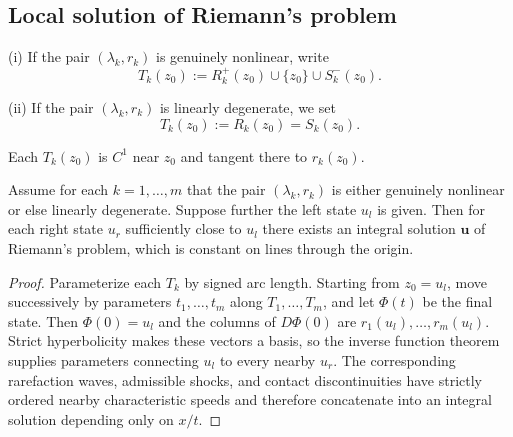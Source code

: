 \subsection{Local solution of Riemann's problem}\label{sec:local-solution-riemanns-problem}

\begin{definition}
\label{def:t-curve}

(i) If the pair $(\lambda_k, r_k)$ is genuinely nonlinear, write
$$T_k(z_0) := R_k^+(z_0) \cup \{z_0\} \cup S_k^-(z_0).$$

(ii) If the pair $(\lambda_k, r_k)$ is linearly degenerate, we set
$$T_k(z_0) := R_k(z_0) = S_k(z_0).$$
\end{definition}

Each $T_k(z_0)$ is $C^1$ near $z_0$ and tangent there to $r_k(z_0)$.

\begin{theorem}
\label{thm:local-solution-riemann-problem}

Assume for each $k=1,\ldots,m$ that the pair $(\lambda_k, r_k)$ is either genuinely nonlinear or else linearly degenerate. Suppose further the left state $u_l$ is given. Then for each right state $u_r$ sufficiently close to $u_l$ there exists an integral solution $\mathbf{u}$ of Riemann's problem, which is constant on lines through the origin.
\end{theorem}

\begin{proof}
\sketch Parameterize each $T_k$ by signed arc length. Starting from $z_0=u_l$, move successively by parameters $t_1,\ldots,t_m$ along $T_1,\ldots,T_m$, and let $\Phi(t)$ be the final state. Then $\Phi(0)=u_l$ and the columns of $D\Phi(0)$ are $r_1(u_l),\ldots,r_m(u_l)$. Strict hyperbolicity makes these vectors a basis, so the inverse function theorem supplies parameters connecting $u_l$ to every nearby $u_r$. The corresponding rarefaction waves, admissible shocks, and contact discontinuities have strictly ordered nearby characteristic speeds and therefore concatenate into an integral solution depending only on $x/t$.
\end{proof}

